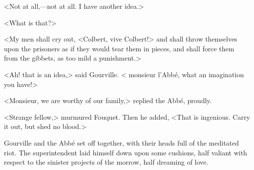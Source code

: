<Not at all,—not at all. I have another idea.>

<What is that?>

<My men shall cry out, <Colbert, vive Colbert!> and shall throw themselves upon the prisoners as if they would tear them in pieces, and shall force them from the gibbets, as too mild a punishment.>

<Ah! that is an idea,> said Gourville. < monsieur l'Abbé, what an imagination you have!>

<Monsieur, we are worthy of our family,> replied the Abbé, proudly.

<Strange fellow,> murmured Fouquet. Then he added, <That is ingenious. Carry it out, but shed no blood.>

Gourville and the Abbé set off together, with their heads full of the meditated riot. The superintendent laid himself down upon some cushions, half valiant with respect to the sinister projects of the morrow, half dreaming of love. 